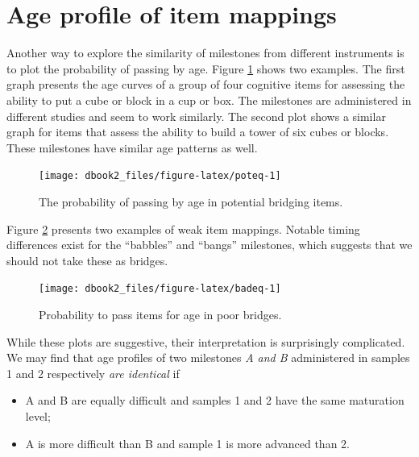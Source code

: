 \documentclass[
]{book}
\providecommand{\tightlist}{%
  \setlength{\itemsep}{0pt}\setlength{\parskip}{0pt}}
\begin{document}
\hypertarget{sec:viewmapping}{%
\section{Age profile of item mappings}\label{sec:viewmapping}}

Another way to explore the similarity of milestones from different instruments is to plot the probability of passing by age. Figure \ref{fig:poteq} shows two examples. The first graph presents the age curves of a group of four cognitive items for assessing the ability to put a cube or block in a cup or box. The milestones are administered in different studies and seem to work similarly. The second plot shows a similar graph for items that assess the ability to build a tower of six cubes or blocks. These milestones have similar age patterns as well.

\begin{figure}

{\centering \texttt{[image: dbook2\_files/figure-latex/poteq-1]} 

}

\caption{The probability of passing by age in potential bridging items.}\label{fig:poteq}
\end{figure}



Figure \ref{fig:badeq} presents two examples of weak item mappings. Notable timing differences exist for the ``babbles'' and ``bangs'' milestones, which suggests that we should not take these as bridges.

\begin{figure}

{\centering \texttt{[image: dbook2\_files/figure-latex/badeq-1]} 

}

\caption{Probability to pass items for age in poor bridges.}\label{fig:badeq}
\end{figure}



While these plots are suggestive, their interpretation is surprisingly complicated. We may find that age profiles of two milestones \emph{A and B} administered in samples 1 and 2 respectively \emph{are identical} if

\begin{itemize}
\tightlist
\item
  A and B are equally difficult and samples 1 and 2 have the same maturation level;
\item
  A is more difficult than B and sample 1 is more advanced than 2.
\end{itemize}
\end{document}

